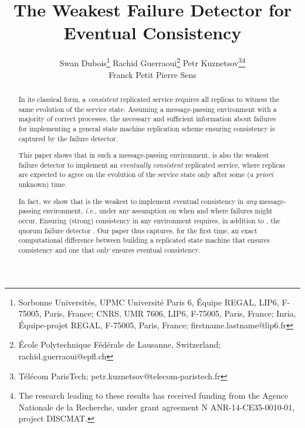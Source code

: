 \documentclass[11pt]{article}
\begin{document}
\sloppy

\title{The Weakest Failure Detector for Eventual Consistency}

\author{
Swan Dubois\protect\footnote{Sorbonne Universit\'es, UPMC Universit\'e
  Paris 6, \'Equipe REGAL, LIP6, F-75005, Paris, France;
CNRS, UMR 7606, LIP6, F-75005, Paris, France;
Inria, \'Equipe-projet REGAL, F-75005, Paris, France;
firstname.lastname@lip6.fr}
\hspace{1cm}Rachid Guerraoui\protect\footnote{\'Ecole Polytechnique F\'ed\'erale de Lausanne, Switzerland; rachid.guerraoui@epfl.ch}
\hspace{1cm}Petr Kuznetsov\protect\footnote{T\'el\'ecom ParisTech;
   petr.kuznetsov@telecom-paristech.fr}\thanks{The research leading to these results has
  received funding from the Agence Nationale de la Recherche,  under
  grant agreement N ANR-14-CE35-0010-01, project DISCMAT.}
\\
Franck Petit\protect\footnotemark[1]
\hspace{1cm} Pierre Sens\protect\footnotemark[1]
}

\date{}


\maketitle


\begin{abstract}
In its classical form,  a \emph{consistent} replicated service requires
all replicas to witness the same evolution of the service state.
Assuming a message-passing environment with a majority of
correct processes, the necessary and sufficient information about
failures for implementing a general state machine replication scheme
ensuring consistency is captured by the  failure detector.


This paper shows that
in such a message-passing environment,   is also the weakest failure detector
to implement
an \emph{eventually consistent} replicated service,
where replicas are expected to agree on the evolution of the service state only after some
(\emph{a priori} unknown) time.

In fact, we show that  is the weakest to implement
eventual consistency in \emph{any} message-passing environment, {\em i.e.}, under any assumption on when and
where
failures might occur.
Ensuring (strong) consistency in any environment
requires, in addition to ,
the quorum failure detector
.
Our paper thus captures, for the first time,
an exact computational difference between
building a replicated state machine that ensures consistency and
one that only ensures eventual consistency.
\end{abstract}
\end{document}
